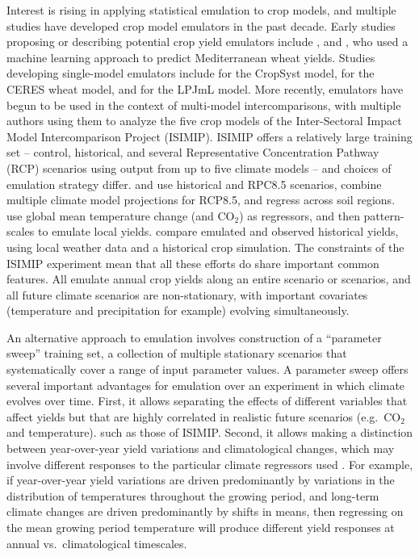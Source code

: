 \documentclass[gmd, manuscript]{copernicus} %
\begin{document}
Interest is rising in applying statistical emulation to crop models, and multiple studies have developed crop model emulators in the past decade.
Early studies proposing or describing potential crop yield emulators include \citet{Howden2005, raisen2006, Lobell2010}, and \citet{Ferrise2011}, who used a machine learning approach to predict Mediterranean wheat yields. 
Studies developing single-model emulators include  \citet{Holzkamper2012} for the CropSyst model, \citet{RUANE2013a} for the CERES wheat model, and \citet{Oyebamiji15} for the LPJmL model. 
More recently, emulators have begun to be used in the context of multi-model intercomparisons, with multiple authors \citep{BLANC2015, BLANC2017, Ostberg2018, Mistry2017}  using them to analyze the five crop models  of the Inter-Sectoral Impact Model Intercomparison Project (ISIMIP). ISIMIP offers a relatively large training set --  control, historical, and several Representative Concentration Pathway (RCP) scenarios using output from up to five climate models \citep{Warszawski3228, Frieler2017} -- and choices of emulation strategy differ.
\citet{BLANC2015} and \citet{BLANC2017} use historical and RPC8.5 scenarios, combine multiple climate model projections for RCP8.5, and regress across soil regions. 
\citet{Ostberg2018} use global mean temperature change (and CO$_2$) as regressors, and then pattern-scales to emulate local yields. 
\citet{Mistry2017} compare emulated and observed historical yields, using local weather data and a historical crop simulation. 
The constraints of the ISIMIP experiment mean that all these efforts do share important common features. 
All emulate annual crop yields along an entire scenario or scenarios, and all future climate scenarios are non-stationary, with important covariates (temperature and precipitation for example) evolving simultaneously. 

An alternative approach to emulation involves construction of a ``parameter sweep'' training set, a collection of multiple stationary scenarios that systematically cover a range of input parameter values.
A parameter sweep offers several important advantages for emulation over an experiment in which climate evolves over time. 
First, it allows separating the effects of different variables that affect yields but that are highly correlated in realistic future scenarios (e.g.\ CO$_2$ and temperature). 
such as those of ISIMIP.
Second, it allows making a distinction between year-over-year yield variations and climatological changes, which may involve different responses to the particular climate regressors used \citep[e.g.][]{Ruane2016}. 
For example, if year-over-year yield variations are driven predominantly by variations in the distribution of temperatures throughout the growing period, and long-term climate changes are driven predominantly by shifts in means, then regressing on the mean growing period temperature will produce different yield responses at annual vs.\ climatological timescales.  
\end{document}
